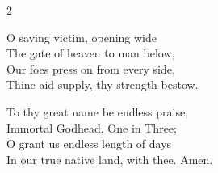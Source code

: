 \begin{multicols}{2}
\raggedcolumns
\begin{enpars}
O saving victim, opening wide\\
The gate of heaven to man below,\\
Our foes press on from every side,\\
Thine aid supply, thy strength bestow.

To thy great name be endless praise,\\
Immortal Godhead, One in Three;\\
O grant us endless length of days\\
In our true native land, with thee.
Amen.
\end{enpars}
\end{multicols}